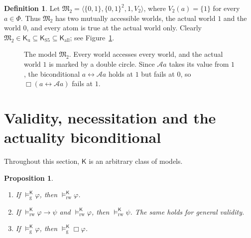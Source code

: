 \documentclass[11pt]{amsart}
\makeatletter
\theoremstyle{plain}
\newtheorem{proposition}[theorem]{Proposition}
\theoremstyle{definition}
\newtheorem{definition}[theorem]{Definition}
\theoremstyle{remark}
\newcommand{\Act}{\mathcal{A}}
\newcommand{\Mod}{\mathfrak{M}}
\newcommand{\Kl}{\mathsf{K}}
\newcommand{\at}{@}
\newcommand{\RWv}[1]{\models^{#1}_{\mathrm{rw}}}
\newcommand{\Gv}[1]{\models^{#1}_{\mathrm{g}}}
\newcommand{\Two}{\Mod_2}
\makeatother
\begin{document}
\begin{definition}
Let $\Two = \langle \{0,1\}, \{0,1\}^2, 1, V_2\rangle$, where
$V_2(a) = \{1\}$ for every $a \in \Phi$. Thus $\Two$ has two mutually
accessible worlds, the actual world $1$ and the world $0$, and every
atom is true at the actual world only. Clearly
$\Two \in \Kl_{\mathrm{u}} \subseteq \Kl_{\mathrm{S5}} \subseteq
\Kl_{\mathrm{all}}$; see Figure~\ref{fig:two}.
\end{definition}

\begin{figure}[ht]
\centering
{}
\caption{The model $\Two$. Every world accesses every world, and the
actual world $1$ is marked by a double circle. Since $\Act a$ takes its
value from $1$, the biconditional $a \leftrightarrow \Act a$ holds at
$1$ but fails at $0$, so $\Box(a \leftrightarrow \Act a)$ fails at
$1$.}
\label{fig:two}
\end{figure}

\section{Validity, necessitation and the actuality biconditional}
\label{sec:results}

Throughout this section, $\Kl$ is an arbitrary class of models.

\begin{proposition}
\label{prop:closure}
\leavevmode
\begin{enumerate}[label=(\roman*)]
\item If $\Gv{\Kl} \varphi$, then $\RWv{\Kl} \varphi$.
\item If $\RWv{\Kl} \varphi \to \psi$ and $\RWv{\Kl} \varphi$, then
  $\RWv{\Kl} \psi$. The same holds for general validity.
\item If $\Gv{\Kl} \varphi$, then $\Gv{\Kl} \Box\varphi$.
\end{enumerate}
\end{proposition}
\end{document}
